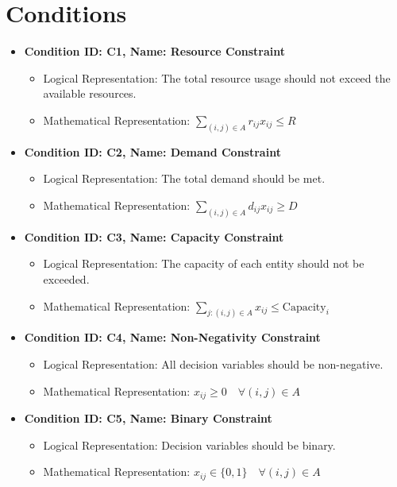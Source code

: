 \documentclass{article}
\begin{document}
\section{Conditions}
\begin{itemize}
    \item \textbf{Condition ID: C1, Name: Resource Constraint}
    \begin{itemize}
        \item Logical Representation: The total resource usage should not exceed the available resources.
        \item Mathematical Representation: $\sum_{(i,j) \in A} r_{ij} x_{ij} \leq R$
    \end{itemize}

    \item \textbf{Condition ID: C2, Name: Demand Constraint}
    \begin{itemize}
        \item Logical Representation: The total demand should be met.
        \item Mathematical Representation: $\sum_{(i,j) \in A} d_{ij} x_{ij} \geq D$
    \end{itemize}

    \item \textbf{Condition ID: C3, Name: Capacity Constraint}
    \begin{itemize}
        \item Logical Representation: The capacity of each entity should not be exceeded.
        \item Mathematical Representation: $\sum_{j:(i,j) \in A} x_{ij} \leq \text{Capacity}_i$
    \end{itemize}

    \item \textbf{Condition ID: C4, Name: Non-Negativity Constraint}
    \begin{itemize}
        \item Logical Representation: All decision variables should be non-negative.
        \item Mathematical Representation: $x_{ij} \geq 0 \quad \forall (i,j) \in A$
    \end{itemize}

    \item \textbf{Condition ID: C5, Name: Binary Constraint}
    \begin{itemize}
        \item Logical Representation: Decision variables should be binary.
        \item Mathematical Representation: $x_{ij} \in \{0, 1\} \quad \forall (i,j) \in A$
    \end{itemize}
\end{itemize}
\end{document}
